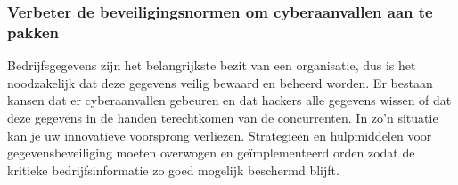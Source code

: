 
\subsubsection{Verbeter de beveiligingsnormen om cyberaanvallen aan te pakken}
Bedrijfsgegevens zijn het belangrijkste bezit van een organisatie, dus is het noodzakelijk dat deze gegevens veilig bewaard en beheerd worden. Er bestaan kansen dat er cyberaanvallen gebeuren en dat hackers alle gegevens wissen of dat deze gegevens in de handen terechtkomen van de concurrenten. In zo’n situatie kan je uw innovatieve voorsprong verliezen. Strategieën en hulpmiddelen voor gegevensbeveiliging moeten overwogen en geïmplementeerd orden zodat de kritieke bedrijfsinformatie zo goed mogelijk beschermd blijft. 

